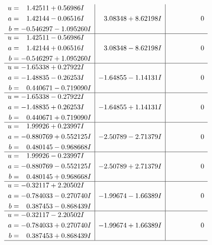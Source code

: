 \documentclass[1p]{elsarticle_modified}
\theoremstyle{definition}
\begin{document}
$$\begin{array}{c|c|c}
\begin{aligned}
u &= \phantom{-}1.42511 + 0.56986 I \\
a &= \phantom{-}1.42144 - 0.06516 I \\
b &= -0.546297 - 1.095260 I\end{aligned}
 & \phantom{-}3.08348 + 8.62198 I & \phantom{-0.000000 } 0 \\ \hline\begin{aligned}
u &= \phantom{-}1.42511 - 0.56986 I \\
a &= \phantom{-}1.42144 + 0.06516 I \\
b &= -0.546297 + 1.095260 I\end{aligned}
 & \phantom{-}3.08348 - 8.62198 I & \phantom{-0.000000 } 0 \\ \hline\begin{aligned}
u &= -1.65338 + 0.27922 I \\
a &= -1.48835 - 0.26253 I \\
b &= \phantom{-}0.440671 - 0.719090 I\end{aligned}
 & -1.64855 - 1.14131 I & \phantom{-0.000000 } 0 \\ \hline\begin{aligned}
u &= -1.65338 - 0.27922 I \\
a &= -1.48835 + 0.26253 I \\
b &= \phantom{-}0.440671 + 0.719090 I\end{aligned}
 & -1.64855 + 1.14131 I & \phantom{-0.000000 } 0 \\ \hline\begin{aligned}
u &= \phantom{-}1.99926 + 0.23997 I \\
a &= -0.880769 + 0.552125 I \\
b &= \phantom{-}0.480145 - 0.968668 I\end{aligned}
 & -2.50789 - 2.71379 I & \phantom{-0.000000 } 0 \\ \hline\begin{aligned}
u &= \phantom{-}1.99926 - 0.23997 I \\
a &= -0.880769 - 0.552125 I \\
b &= \phantom{-}0.480145 + 0.968668 I\end{aligned}
 & -2.50789 + 2.71379 I & \phantom{-0.000000 } 0 \\ \hline\begin{aligned}
u &= -0.32117 + 2.20502 I \\
a &= -0.784033 - 0.270740 I \\
b &= \phantom{-}0.387453 - 0.868439 I\end{aligned}
 & -1.99674 - 1.66389 I & \phantom{-0.000000 } 0 \\ \hline\begin{aligned}
u &= -0.32117 - 2.20502 I \\
a &= -0.784033 + 0.270740 I \\
b &= \phantom{-}0.387453 + 0.868439 I\end{aligned}
 & -1.99674 + 1.66389 I & \phantom{-0.000000 } 0\\
 \hline 
 \end{array}$$\newpage\newpage\renewcommand{\arraystretch}{1}
\end{document}
